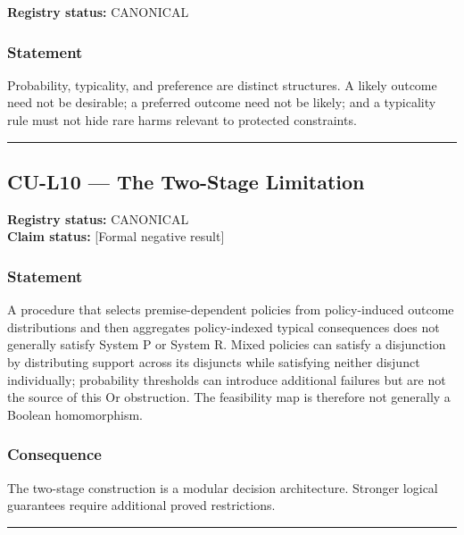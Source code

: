 \documentclass[
  11pt,
]{article}
\begin{document}
\textbf{Registry status:} CANONICAL

\subsubsection{Statement}\label{statement-32}

Probability, typicality, and preference are distinct structures. A
likely outcome need not be desirable; a preferred outcome need not be
likely; and a typicality rule must not hide rare harms relevant to
protected constraints.

\begin{center}\rule{0.5\linewidth}{0.5pt}\end{center}

\subsection{CU-L10 --- The Two-Stage
Limitation}\label{cu-l10-the-two-stage-limitation}

\textbf{Registry status:} CANONICAL\\
\textbf{Claim status:} {[}Formal negative result{]}

\subsubsection{Statement}\label{statement-33}

A procedure that selects premise-dependent policies from policy-induced
outcome distributions and then aggregates policy-indexed typical
consequences does not generally satisfy System P or System R. Mixed
policies can satisfy a disjunction by distributing support across its
disjuncts while satisfying neither disjunct individually; probability
thresholds can introduce additional failures but are not the source of
this Or obstruction. The feasibility map is therefore not generally a
Boolean homomorphism.

\subsubsection{Consequence}\label{consequence-4}

The two-stage construction is a modular decision architecture. Stronger
logical guarantees require additional proved restrictions.

\begin{center}\rule{0.5\linewidth}{0.5pt}\end{center}
\end{document}
